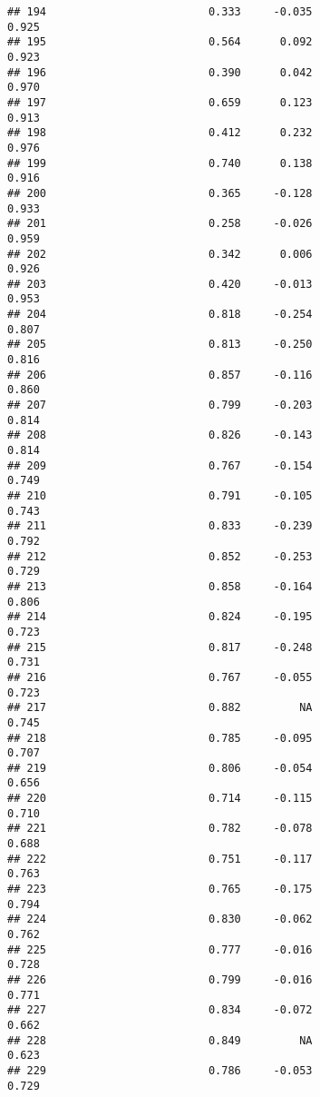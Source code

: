 \documentclass[
]{article}
\begin{document}
\begin{verbatim}
## 194                         0.333     -0.035                     0.925
## 195                         0.564      0.092                     0.923
## 196                         0.390      0.042                     0.970
## 197                         0.659      0.123                     0.913
## 198                         0.412      0.232                     0.976
## 199                         0.740      0.138                     0.916
## 200                         0.365     -0.128                     0.933
## 201                         0.258     -0.026                     0.959
## 202                         0.342      0.006                     0.926
## 203                         0.420     -0.013                     0.953
## 204                         0.818     -0.254                     0.807
## 205                         0.813     -0.250                     0.816
## 206                         0.857     -0.116                     0.860
## 207                         0.799     -0.203                     0.814
## 208                         0.826     -0.143                     0.814
## 209                         0.767     -0.154                     0.749
## 210                         0.791     -0.105                     0.743
## 211                         0.833     -0.239                     0.792
## 212                         0.852     -0.253                     0.729
## 213                         0.858     -0.164                     0.806
## 214                         0.824     -0.195                     0.723
## 215                         0.817     -0.248                     0.731
## 216                         0.767     -0.055                     0.723
## 217                         0.882         NA                     0.745
## 218                         0.785     -0.095                     0.707
## 219                         0.806     -0.054                     0.656
## 220                         0.714     -0.115                     0.710
## 221                         0.782     -0.078                     0.688
## 222                         0.751     -0.117                     0.763
## 223                         0.765     -0.175                     0.794
## 224                         0.830     -0.062                     0.762
## 225                         0.777     -0.016                     0.728
## 226                         0.799     -0.016                     0.771
## 227                         0.834     -0.072                     0.662
## 228                         0.849         NA                     0.623
## 229                         0.786     -0.053                     0.729

\end{verbatim}
\end{document}
